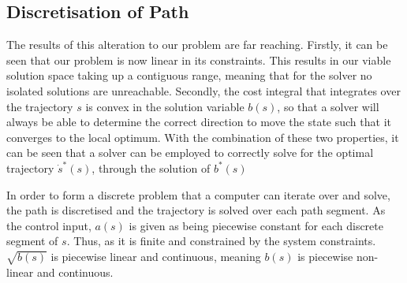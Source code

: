 \subsection{Discretisation of Path}

The results of this alteration to our problem are far reaching. Firstly, it can be seen that our problem is now linear in its constraints. This results in our viable solution space taking up a contiguous range, meaning that for the solver no isolated solutions are unreachable.
Secondly, the cost integral that integrates over the trajectory $s$ is convex in the solution variable $b(s)$, so that a solver will always be able to determine the correct direction to move the state such that it converges to the local optimum.
With the combination of these two properties, it can be seen that a solver can be employed to correctly solve for the optimal trajectory $\dot{s}^*(s)$, through the solution of $b^*(s)$

In order to form a discrete problem that a computer can iterate over and solve, the path is discretised and the trajectory is solved over each path segment. As the control input, $a(s)$ is given as being piecewise constant for each discrete segment of $s$. Thus, as it is finite and constrained by the system constraints. $\sqrt{b(s)}$ is piecewise linear and continuous, meaning $b(s)$ is piecewise non-linear and continuous. 
